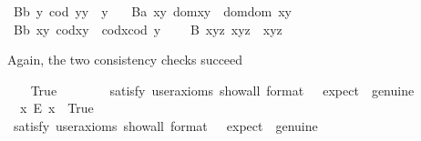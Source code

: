 \begin{isabellebody}
\ B{}b{\isacharcolon}\ {\isachardoublequoteopen}\isactrlbold {\isasymforall}y{\isachardot}\ {\isacharparenleft}cod\ y{\isacharparenright}{\isasymcdot}y\ {\isasymcong}\ y{\isachardoublequoteclose}\ \ \isanewline
\ B{}a{\isacharcolon}\ {\isachardoublequoteopen}\isactrlbold {\isasymforall}x{\isachardot}\isactrlbold {\isasymforall}y{\isachardot}\ dom{\isacharparenleft}x{\isasymcdot}y{\isacharparenright}\ {\isasymcong}\ dom{\isacharparenleft}{\isacharparenleft}dom\ x{\isacharparenright}{\isasymcdot}y{\isacharparenright}{\isachardoublequoteclose}\ \ \isanewline
\ B{}b{\isacharcolon}\ {\isachardoublequoteopen}\isactrlbold {\isasymforall}x{\isachardot}\isactrlbold {\isasymforall}y{\isachardot}\ cod{\isacharparenleft}x{\isasymcdot}y{\isacharparenright}\ {\isasymcong}\ cod{\isacharparenleft}x{\isasymcdot}{\isacharparenleft}cod\ y{\isacharparenright}{\isacharparenright}{\isachardoublequoteclose}\ \ \isanewline
\ \ B{}{\isacharcolon}\ {\isachardoublequoteopen}\isactrlbold {\isasymforall}x{\isachardot}\isactrlbold {\isasymforall}y{\isachardot}\isactrlbold {\isasymforall}z{\isachardot}\ x{\isasymcdot}{\isacharparenleft}y{\isasymcdot}z{\isacharparenright}\ {\isasymcong}\ {\isacharparenleft}x{\isasymcdot}y{\isacharparenright}{\isasymcdot}z{\isachardoublequoteclose}%
\begin{isamarkuptext}%
Again, the two consistency checks succeed%
\end{isamarkuptext}\isamarkuptrue%
\ \ \isamarkupfalse%
\ True\ \ %
\isanewline
\ \ \ \ \isamarkupfalse%
\ {\isacharbrackleft}satisfy{\isacharcomma}\ user{\isacharunderscore}axioms{\isacharcomma}\ show{\isacharunderscore}all{\isacharcomma}\ format\ {\isacharequal}\ {}{\isacharcomma}\ expect\ {\isacharequal}\ genuine{\isacharbrackright}%
\isadelimproof
\ %
\endisadelimproof
%
\isatagproof
{}\isamarkupfalse%
%
\endisatagproof
{\isafoldproof}%
%
\isadelimproof
%
\endisadelimproof
\isanewline
\ \ \isamarkupfalse%
\ \ {\isachardoublequoteopen}{\isasymexists}x{\isachardot}\ \isactrlbold {\isasymnot}{\isacharparenleft}E\ x{\isacharparenright}{\isachardoublequoteclose}\ \ True\ \ \ %
\ \ \isanewline
\ \ \ \ \isamarkupfalse%
\ {\isacharbrackleft}satisfy{\isacharcomma}\ user{\isacharunderscore}axioms{\isacharcomma}\ show{\isacharunderscore}all{\isacharcomma}\ format\ {\isacharequal}\ {}{\isacharcomma}\ expect\ {\isacharequal}\ genuine{\isacharbrackright}%

\end{isabellebody}
